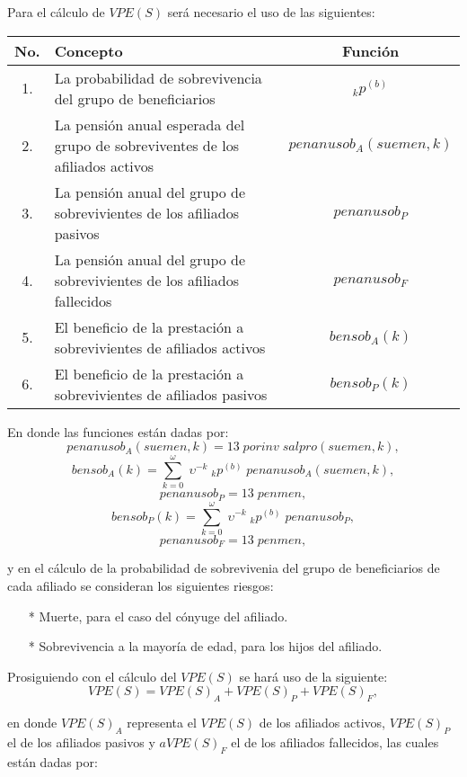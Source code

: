 \documentclass[12pt,letterpaper,titlepage]{article}
\begin{document}
{Para el cálculo de $V\!PE(S)$ será necesario el uso de las siguientes:
\begin{center}
	\begin{tabular}{|c||p{8cm}||c|} %
		\hline 
		\rule[-1ex]{0pt}{2.5ex}No. & Concepto & Función \\ 
		\hline 
		\rule[-1ex]{0pt}{2.5ex} 1. & La probabilidad de sobrevivencia del grupo de beneficiarios & $_{k}p^{(b)}$ \\ 
		\hline 
		\rule[-1ex]{0pt}{2.5ex} 2. & La pensión anual esperada del grupo de sobreviventes de los afiliados activos & $penanusob_{A}(suemen,k)$\\
		\hline 
		\rule[-1ex]{0pt}{2.5ex} 3. & La pensión anual del grupo de sobrevivientes de los afiliados pasivos & $penanusob_{P}$ \\ 
		\hline 
		\rule[-1ex]{0pt}{2.5ex} 4. & La pensión anual del grupo de sobrevivientes de los afiliados fallecidos & $penanusob_{F}$ \\ 
		\hline 
		\rule[-1ex]{0pt}{2.5ex} 5. & El beneficio de la prestación a sobrevivientes de afiliados activos & $bensob_{A}(k)$ \\ 
		\hline 
		\rule[-1ex]{0pt}{2.5ex} 6. & El beneficio de la prestación a sobrevivientes de afiliados pasivos & $bensob_{P}(k)$ \\ 
		\hline 
	\end{tabular} 
\end{center}

En donde las funciones están dadas por:
\[penanusob_{A}(suemen,k)=13\;porinv\;sal\!pro(suemen,k),\]
\[bensob_{A}(k)=\sum\limits_{k=0}^\omega\;\upsilon^{-k}\;_{k}p^{(b)}\;penanusob_{A}(suemen,k),\]
\[penanusob_{P}=13\;penmen,\]
\[bensob_{P}(k)=\sum\limits_{k=0}^\omega\;\upsilon^{-k}\;_{k}p^{(b)}\;penanusob_{P},\]
\[penanusob_{F}=13\;penmen,\]
 
y en el cálculo de la probabilidad de sobrevivenia del grupo de beneficiarios de cada afiliado se consideran los siguientes riesgos:

\begin{itemize}
	\item [*] Muerte, para el caso del cónyuge del afiliado.
	\item [*] Sobrevivencia a la mayoría de edad, para los hijos del afiliado.
\end{itemize}

Prosiguiendo con el cálculo del $V\!PE(S)$ se hará uso de la siguiente:
\[V\!PE(S)=V\!PE(S)_{A}+V\!PE(S)_{P}+V\!PE(S)_{F},\]

en donde $V\!PE(S)_{A}$ representa el $V\!PE(S)$ de los afiliados activos, $V\!PE(S)_{P}$ el de los afiliados pasivos y $aV\!PE(S)_{F}$ el de los afiliados fallecidos, las cuales están dadas por:

}
\end{document}
